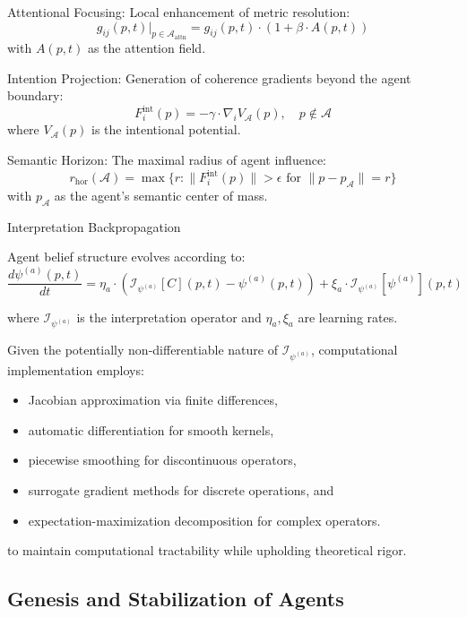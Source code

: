 Attentional Focusing: Local enhancement of metric resolution:
\begin{equation}
g_{ij}(p,t)\big|_{p \in \mathcal{A}_{\mathrm{attn}}} = g_{ij}(p,t) \cdot (1 + \beta \cdot A(p,t))
\end{equation}
with \(A(p,t)\) as the attention field.

Intention Projection: Generation of coherence gradients beyond the agent boundary:
\begin{equation}
F_i^{\mathrm{int}}(p) = -\gamma \cdot \nabla_i V_{\mathcal{A}}(p), \quad p \notin \mathcal{A}
\end{equation}
where \(V_{\mathcal{A}}(p)\) is the intentional potential.

Semantic Horizon: The maximal radius of agent influence:
\begin{equation}
r_{\mathrm{hor}}(\mathcal{A}) = \max\{r : \|F_i^{\mathrm{int}}(p)\| > \epsilon \text{ for } \|p - p_{\mathcal{A}}\| = r\}
\end{equation}
with \(p_{\mathcal{A}}\) as the agent's semantic center of mass.

Interpretation Backpropagation

Agent belief structure evolves according to:
\begin{equation}
\frac{d\psi^{(a)}(p,t)}{dt} = \eta_a \cdot (\mathcal{I}_{\psi^{(a)}}[C](p,t) - \psi^{(a)}(p,t)) + \xi_a \cdot \mathcal{I}_{\psi^{(a)}}[\psi^{(a)}](p,t)
\end{equation}

where \(\mathcal{I}_{\psi^{(a)}}\) is the interpretation operator and \(\eta_a, \xi_a\) are learning rates.

Given the potentially non-differentiable nature of \(\mathcal{I}_{\psi^{(a)}}\), computational implementation employs:
\begin{itemize}
    \item Jacobian approximation via finite differences,
    \item automatic differentiation for smooth kernels,
    \item piecewise smoothing for discontinuous operators,
    \item surrogate gradient methods for discrete operations, and
    \item expectation-maximization decomposition for complex operators.
\end{itemize}
to maintain computational tractability while upholding theoretical rigor.

\subsection{Genesis and Stabilization of Agents}

